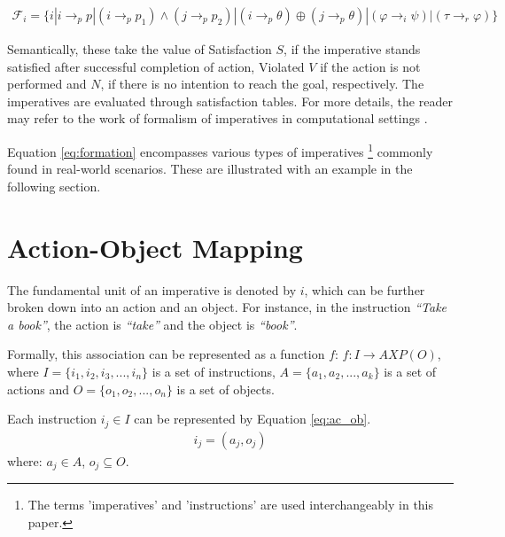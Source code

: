 \documentclass[a4paper,11pt]{lmcs}
\begin{document}
\begin{eqnarray}
\label{eq:formation}
 \mathcal{F}_i = \{i|i \rightarrow_p p| (i \rightarrow_p p_1) \wedge (j \rightarrow_p p_2)|(i \rightarrow_p \theta) \oplus (j \rightarrow_p \theta)|(\varphi \rightarrow_i \psi)| (\tau \rightarrow_r \varphi)
\}
\end{eqnarray}


Semantically, these take the value of Satisfaction $S$, if the imperative stands satisfied after successful completion of action, Violated $V$ if the action is not performed and $N$, if there is no intention to reach the goal, respectively. The imperatives are evaluated through satisfaction tables. For more details, the reader may refer to the work of formalism of imperatives in computational settings \cite{mira}.

Equation \ref{eq:formation} encompasses various types of imperatives \footnote{The terms 'imperatives' and 'instructions' are used interchangeably in this paper.} commonly found in real-world scenarios. These are illustrated with an example in the following section.

\section{Action-Object Mapping}
\label{sec:class}
The fundamental unit of an imperative is denoted by $i$, which can be further broken down into an action and an object.
For instance, in the instruction \textit{``Take a book''}, the action is \textit{``take''} and the object is \textit{``book''}.

Formally, this association can be represented as a function $f$:
$f:I\rightarrow A X P(O)$, where $I = \{i_1,i_2,i_3,...,i_n\}$ is a set of instructions, $A = \{a_1,a_2,...,a_k\}$ is a set of actions and $O = \{o_1,o_2,...,o_n\}$ is a set of objects.

Each instruction $i_j \in I$ can be represented by Equation \ref{eq:ac_ob}.
\begin{eqnarray}
\label{eq:ac_ob}
 i_j = (a_j,o_j)
\end{eqnarray}
where: $a_j \in A$, $o_j \subseteq O$.
\end{document}
